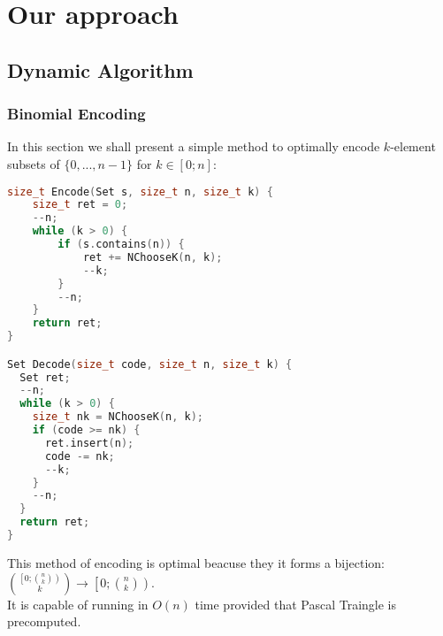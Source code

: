 \section{Our approach}
\subsection{Dynamic Algorithm}
\subsubsection{Binomial Encoding}
In this section we shall present a simple method to optimally encode $k$-element subsets of $\{0,...,n-1\}$ for $k\in\left[0;n\right]$:
\begin{lstlisting}[language=C++]
size_t Encode(Set s, size_t n, size_t k) {
	size_t ret = 0;
	--n;
	while (k > 0) {
		if (s.contains(n)) {
			ret += NChooseK(n, k);
			--k;
		}
		--n;
	}
	return ret;
}

Set Decode(size_t code, size_t n, size_t k) {
  Set ret;
  --n;
  while (k > 0) {
    size_t nk = NChooseK(n, k);
    if (code >= nk) {
      ret.insert(n);
      code -= nk;
      --k;
    }
    --n;
  }
  return ret;
}
\end{lstlisting}
This method of encoding is optimal beacuse they it forms a bijection: ${\left[0; {n \choose k}\right) \choose k}\rightarrow\left[0; {n \choose k}\right)$.\\
It is capable of running in $O(n)$ time provided that Pascal Traingle is precomputed.
